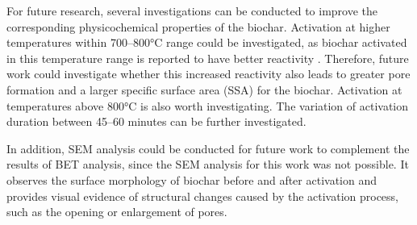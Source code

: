\vspace{0.3em}

For future research, several investigations can be conducted to improve the corresponding physicochemical properties of the biochar. Activation at higher temperatures within 700--800°C range could be investigated, as biochar activated in this temperature range is reported to have better reactivity \cite{Sajjadi2019}. Therefore, future work could investigate whether this increased reactivity also leads to greater pore formation and a larger specific surface area (SSA) for the biochar. Activation at temperatures above 800°C is also worth investigating. The variation of activation duration between 45--60 minutes can be further investigated.

\vspace{0.3em} 

In addition, SEM analysis could be conducted for future work to complement the results of BET analysis, since the SEM analysis for this work was not possible. It observes the surface morphology of biochar before and after activation and provides visual evidence of structural changes caused by the activation process, such as the opening or enlargement of pores. 

















